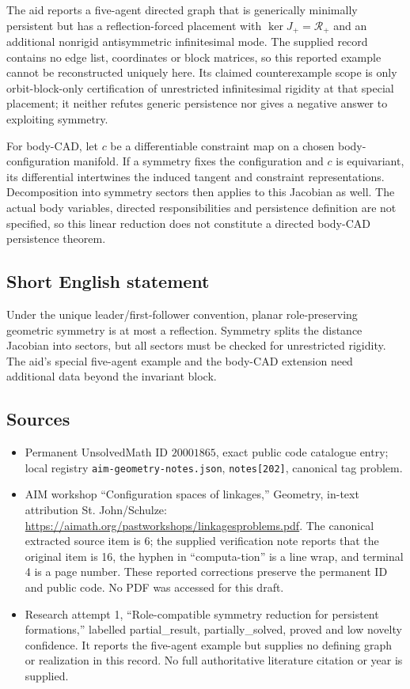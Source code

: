 \documentclass[11pt]{article}
\begin{document}
The aid reports a five-agent directed graph that is generically minimally persistent but has a reflection-forced placement with \(\ker J_+=\mathcal R_+\) and an additional nonrigid antisymmetric infinitesimal mode. The supplied record contains no edge list, coordinates or block matrices, so this reported example cannot be reconstructed uniquely here. Its claimed counterexample scope is only orbit-block-only certification of unrestricted infinitesimal rigidity at that special placement; it neither refutes generic persistence nor gives a negative answer to exploiting symmetry.

For body-CAD, let \(c\) be a differentiable constraint map on a chosen body-configuration manifold. If a symmetry fixes the configuration and \(c\) is equivariant, its differential intertwines the induced tangent and constraint representations. Decomposition into symmetry sectors then applies to this Jacobian as well. The actual body variables, directed responsibilities and persistence definition are not specified, so this linear reduction does not constitute a directed body-CAD persistence theorem.
\subsection{Short English statement}
Under the unique leader/first-follower convention, planar role-preserving geometric symmetry is at most a reflection. Symmetry splits the distance Jacobian into sectors, but all sectors must be checked for unrestricted rigidity. The aid's special five-agent example and the body-CAD extension need additional data beyond the invariant block.
\subsection{Sources}
\begin{itemize}
\item Permanent UnsolvedMath ID \(20001865\), exact public code catalogue entry; local registry \texttt{aim-geometry-notes.json}, \texttt{notes[202]}, canonical tag problem.
\item AIM workshop ``Configuration spaces of linkages,'' Geometry, in-text attribution St. John/Schulze: \url{https://aimath.org/pastworkshops/linkagesproblems.pdf}. The canonical extracted source item is 6; the supplied verification note reports that the original item is 16, the hyphen in ``computa-tion'' is a line wrap, and terminal 4 is a page number. These reported corrections preserve the permanent ID and public code. No PDF was accessed for this draft.
\item Research attempt 1, ``Role-compatible symmetry reduction for persistent formations,'' labelled partial\_result, partially\_solved, proved and low novelty confidence. It reports the five-agent example but supplies no defining graph or realization in this record. No full authoritative literature citation or year is supplied.
\end{itemize}
\end{document}
